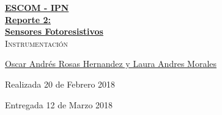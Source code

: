 \documentclass[12pt, fleqn]{article}                            %
\author{Oscar Andrés Rosas}                                     %
\theoremstyle{break}                                            %
\begin{document}
\begin{titlepage}
    
    \pagecolor{TitlePageColor}                                      %
    \color{white}                                                   %

    \vspace                                                         %
    \baselineskip                                                   %

    \makebox[0pt][l]{\rule{1.3\textwidth}{3pt}}                     %
    
    \href{https://compilandoconocimiento.com}                       %
    {\textbf{\textsc{\Huge ESCOM - IPN}}}\\[2.7cm]                  %

    \href{\ProjectNameLink/LibroAnalisisDeAlgoritmos}               %
    {\fontsize{35}{40}                                              %
        \selectfont
        \textbf{Reporte 2: \\Sensores Fotoresistivos}}\\[0.5cm]     %
    \textcolor{ColorSubtext}                                        %
        {\textsc{\LARGE Instrumentación}}                           %
    
    \vfill                                                          %
    
    \href{\ProjectAuthorLink}                                       %
    {\LARGE 
    \textsf{Oscar Andrés Rosas Hernandez y Laura Andres Morales}}   %

    \vspace                                                         %
    \baselineskip                                                   %
    
    {\large \textsf{Realizada 20 de Febrero 2018}}                  %
    
    {\large \textsf{Entregada 12 de Marzo 2018}}                    %

\end{titlepage}
\end{document}

